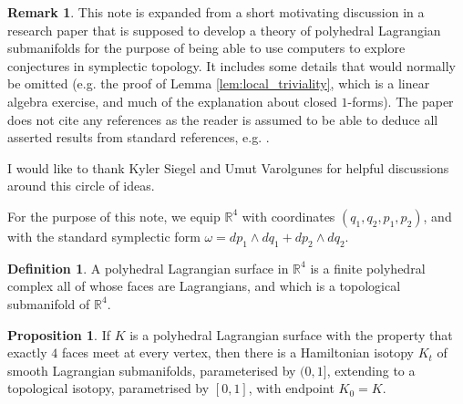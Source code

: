\documentclass[11pt]{article}
\author{Mohammed Abouzaid}
\date{February 13, 2026}
\newcommand{\bR}{\mathbb{R}}
\theoremstyle{definition}
\newtheorem{definition}{Definition}
\newtheorem{proposition}{Proposition}
\newtheorem{remark}{Remark}
\begin{document}
\maketitle
\begin{remark}
  This note is expanded from a short motivating discussion in a research paper that is supposed to develop a theory of polyhedral Lagrangian submanifolds for the purpose of being able to use computers to explore conjectures in symplectic topology. It includes some details that would normally be omitted (e.g. the proof of Lemma \ref{lem:local_triviality}, which is a linear algebra exercise, and much of the explanation about closed $1$-forms). The paper does not cite any references as the reader is assumed to be able to deduce all asserted results from standard references, e.g. \cite{Hirsch,MDS}.

  I would like to thank Kyler Siegel and Umut Varolgunes for helpful discussions around this circle of ideas.
\end{remark}


For the purpose of this note, we equip $\bR^4$ with coordinates $(q_1, q_2, p_1, p_2)$, and with the standard symplectic form $\omega = dp_1 \wedge dq_1 + dp_2 \wedge dq_2$.
\begin{definition}
  A polyhedral Lagrangian surface in $\bR^4$ is a finite polyhedral complex all of whose faces are Lagrangians, and which is a topological submanifold of $\bR^4$.
\end{definition}

\begin{proposition} \label{prop:existence_Hamiltonian_family}
If $K$ is a polyhedral Lagrangian surface with the property that exactly $4$ faces meet at every vertex, then there is a Hamiltonian isotopy $K_t$ of smooth Lagrangian submanifolds, parameterised by $(0,1]$, extending to a topological isotopy, parametrised by $[0,1]$, with endpoint $K_0 = K$.
  \end{proposition}
\end{document}

